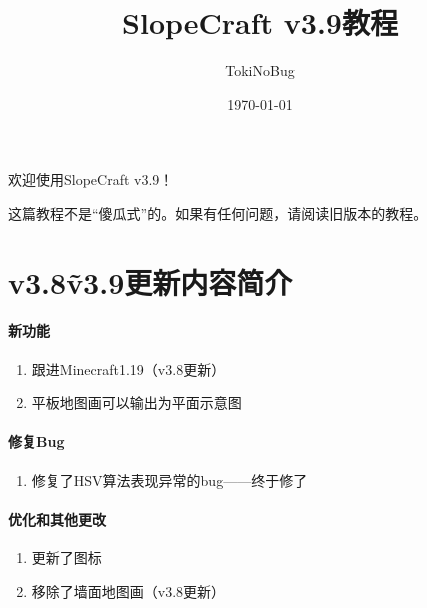 \documentclass[UTF8]{ctexart}
\title{SlopeCraft v3.9教程}
\author{TokiNoBug}
\date{\today}
\begin{document}
\maketitle

欢迎使用SlopeCraft v3.9！

这篇教程不是“傻瓜式”的。如果有任何问题，请阅读旧版本的教程。

\section{v3.8\~v3.9更新内容简介}

\paragraph{新功能}
\begin{enumerate}
    \item 跟进Minecraft1.19（v3.8更新）
    \item 平板地图画可以输出为平面示意图
\end{enumerate}

\paragraph{修复Bug}
\begin{enumerate}
    \item 修复了HSV算法表现异常的bug——终于修了
\end{enumerate}

\paragraph{优化和其他更改}
\begin{enumerate}
    \item 更新了图标
    \item 移除了墙面地图画（v3.8更新）
\end{enumerate}

\pagebreak
\end{document}
